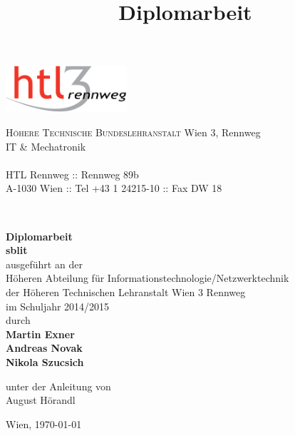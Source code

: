 \documentclass[a4paper,ngerman,naustrian,DIV=12,BCOR=1cm]{scrbook}
\begin{document}
\title{Diplomarbeit}
\begin{titlepage}
\begin{minipage}[b]{1\columnwidth}
\parbox[b]{50mm}{\includegraphics[width=45mm]{HTL3RLogoRGB}}
\hfill
\parbox[b]{130mm}{\footnotesize \textsc{Höhere Technische Bundeslehranstalt} Wien 3, Rennweg\\
IT \& Mechatronik\\
\\
HTL Rennweg :: Rennweg 89b\\
A-1030 Wien :: Tel +43 1 24215-10 :: Fax DW 18
}\\
\mbox{}
\end{minipage}

\vspace{1cm}


\begin{center}
\textbf{\LARGE{}Diplomarbeit}{\large{}}\\
{\large{}\vspace{15mm}
 }\textbf{\large{}sblit}\\
 \vspace{15mm}
 ausgeführt an der\\
 Höheren Abteilung für Informationstechnologie/Netzwerktechnik\\
 der Höheren Technischen Lehranstalt Wien 3 Rennweg\\
 \vspace{1cm}
 im Schuljahr 2014/2015\\
 \vspace{1cm}
 durch\\
 \vspace{0.5cm}
\textbf{\large{}Martin Exner}\\
\textbf{\large{}Andreas Novak}\\
\textbf{\large{}Nikola Szucsich}\\

\par\end{center}{\large \par}

\begin{center}
\vspace{20mm}
 \normalsize unter der Anleitung von\\
 \vspace{0.5cm}
 August Hörandl
\par\end{center}

\begin{center}
\vspace{5mm}
Wien, \today
\par\end{center}

\end{titlepage}%
\end{document}
